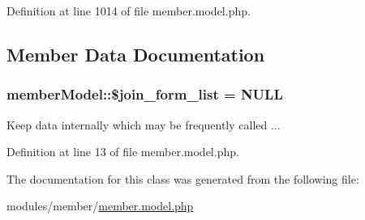 Definition at line 1014 of file member.\+model.\+php.



\subsection{Member Data Documentation}
\subsubsection[{\texorpdfstring{\$join\+\_\+form\+\_\+list}{$join_form_list}}]{\setlength{\rightskip}{0pt plus 5cm}member\+Model\+::\$join\+\_\+form\+\_\+list = N\+U\+LL}\hypertarget{classmemberModel_aa9b942e17ed74955c8700dd74d75d2b2}{}\label{classmemberModel_aa9b942e17ed74955c8700dd74d75d2b2}


Keep data internally which may be frequently called ... 



Definition at line 13 of file member.\+model.\+php.



The documentation for this class was generated from the following file\+:\begin{DoxyCompactItemize}
\item 
modules/member/\hyperlink{member_8model_8php}{member.\+model.\+php}\end{DoxyCompactItemize}
